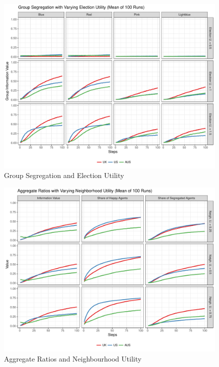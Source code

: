 \documentclass[12pt, a4paper]{article}
\begin{document}
	\begin{figure}[bp!]
		\centering
		\caption{Group Segregation and Election Utility}
		\includegraphics[scale=0.6]{./Plots/el_grp_ratios.pdf}
	\end{figure}
	
	\begin{figure}[bp!]
		\centering
		\caption{Aggregate Ratios and Neighbourhood Utility}
		\includegraphics[scale=0.6]{./Plots/nb_agg_ratios.pdf}
	\end{figure}
	
\end{document}
